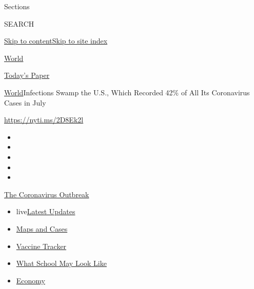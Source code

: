 Sections

SEARCH

\protect\hyperlink{site-content}{Skip to
content}\protect\hyperlink{site-index}{Skip to site index}

\href{https://www.nytimes3xbfgragh.onion/section/world}{World}

\href{https://myaccount.nytimes3xbfgragh.onion/auth/login?response_type=cookie\&client_id=vi}{}

\href{https://www.nytimes3xbfgragh.onion/section/todayspaper}{Today's
Paper}

\href{/section/world}{World}\textbar{}Infections Swamp the U.S., Which
Recorded 42\% of All Its Coronavirus Cases in July

\url{https://nyti.ms/2D8Ek2l}

\begin{itemize}
\item
\item
\item
\item
\item
\end{itemize}

\href{https://www.nytimes3xbfgragh.onion/news-event/coronavirus?action=click\&pgtype=Article\&state=default\&region=TOP_BANNER\&context=storylines_menu}{The
Coronavirus Outbreak}

\begin{itemize}
\tightlist
\item
  live\href{https://www.nytimes3xbfgragh.onion/2020/08/02/world/coronavirus-updates.html?action=click\&pgtype=Article\&state=default\&region=TOP_BANNER\&context=storylines_menu}{Latest
  Updates}
\item
  \href{https://www.nytimes3xbfgragh.onion/interactive/2020/us/coronavirus-us-cases.html?action=click\&pgtype=Article\&state=default\&region=TOP_BANNER\&context=storylines_menu}{Maps
  and Cases}
\item
  \href{https://www.nytimes3xbfgragh.onion/interactive/2020/science/coronavirus-vaccine-tracker.html?action=click\&pgtype=Article\&state=default\&region=TOP_BANNER\&context=storylines_menu}{Vaccine
  Tracker}
\item
  \href{https://www.nytimes3xbfgragh.onion/interactive/2020/07/29/us/schools-reopening-coronavirus.html?action=click\&pgtype=Article\&state=default\&region=TOP_BANNER\&context=storylines_menu}{What
  School May Look Like}
\item
  \href{https://www.nytimes3xbfgragh.onion/live/2020/07/31/business/stock-market-today-coronavirus?action=click\&pgtype=Article\&state=default\&region=TOP_BANNER\&context=storylines_menu}{Economy}
\end{itemize}

